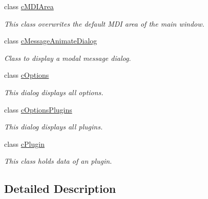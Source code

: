 \begin{DoxyCompactItemize}
class \hyperlink{classc_m_d_i_area}{c\+M\+D\+I\+Area}
\begin{DoxyCompactList}\small\item\em This class overwrites the default M\+DI area of the main window. \end{DoxyCompactList}\item 
class \hyperlink{classc_message_animate_dialog}{c\+Message\+Animate\+Dialog}
\begin{DoxyCompactList}\small\item\em Class to display a modal message dialog. \end{DoxyCompactList}\item 
class \hyperlink{classc_options}{c\+Options}
\begin{DoxyCompactList}\small\item\em This dialog displays all options. \end{DoxyCompactList}\item 
class \hyperlink{classc_options_plugins}{c\+Options\+Plugins}
\begin{DoxyCompactList}\small\item\em This dialog displays all plugins. \end{DoxyCompactList}\item 
class \hyperlink{classc_plugin}{c\+Plugin}
\begin{DoxyCompactList}\small\item\em This class holds data of an plugin. \end{DoxyCompactList}\end{DoxyCompactItemize}


\subsection{Detailed Description}
